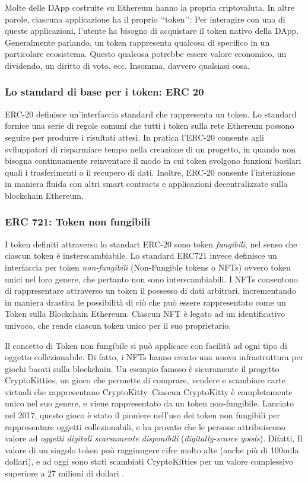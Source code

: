 Molte delle DApp costruite su Ethereum hanno la propria criptovaluta. In altre parole, ciascuna applicazione ha il proprio ‘‘token’’: Per interagire con una di queste applicazioni, l'utente ha bisogno di acquistare il token nativo della DApp. Generalmente parlando, un token rappresenta qualcosa di specifico in un particolare ecosistema. Questo qualcosa potrebbe essere valore economico, un dividendo, un diritto di voto, ecc. Insomma, davvero qualsiasi cosa.

\subsubsection{Lo standard di base per i token: ERC 20}

ERC-20 definisce un’interfaccia standard che rappresenta un token. Lo standard fornice una serie di regole comuni che tutti i token sulla rete Ethereum possono seguire per produrre i risultati attesi. In pratica l'ERC-20 consente agli sviluppatori di risparmiare tempo nella creazione di un progetto, in quando non bisogna continuamente reinventare il modo in cui token svolgono funzioni basilari quali  i trasferimenti o il recupero di dati. Inoltre, ERC-20 consente l'interazione in maniera fluida con altri smart contracts e applicazioni decentralizzate sulla blockchain Ethereum. 

\subsubsection{ERC 721: Token non fungibili}

I token definiti attraverso lo standart ERC-20 sono token \textit{fungibili}, nel senso che ciascun token è insterscambiabile. Lo standard ERC721 \cite{K6} invece definisce un interfaccia per token \textit{non-fungibili} (Non-Fungible tokens o NFTs) ovvero token unici nel loro genere, che pertanto non sono interscambiabili. I NFTs consentono di rappresentare attraverso un token il possesso di dati arbitrari, incrementando in maniera drastica le possibilità di ciò che può essere rappresentato come un Token sulla Blockchain Ethereum. Ciascun NFT è legato ad un identificativo univoco, che rende ciascun token unico per il suo proprietario.

Il concetto di Token non fungibile si può applicare con facilità ad ogni tipo di oggetto collezionabile. Di fatto, i NFTs hanno creato una nuova infrastruttura per giochi basati sulla blockchain. Un esempio famoso è sicuramente il progetto CryptoKitties, un gioco che permette di comprare, vendere e scambiare carte virtuali che rappresentano CryptoKitty. Ciascun CryptoKitty è completamente unico nel suo genere, e viene rappresentato da un token non-fungibile. Lanciato nel 2017, questo gioco è stato il pioniere nell'uso dei token non fungibili per rappresentare oggetti collezionabili, e ha provato che le persone attribuiscono valore ad \textit{oggetti digitali scarsamente disponibili} (\textit{digitally-scarce goods}). Difatti, Il valore di un singolo token può raggiungere cifre molto alte (anche più di 100mila dollari), e ad oggi sono stati scambiati CryptoKitties per un valore complessivo superiore a 27 milioni di dollari \cite{K11}.

